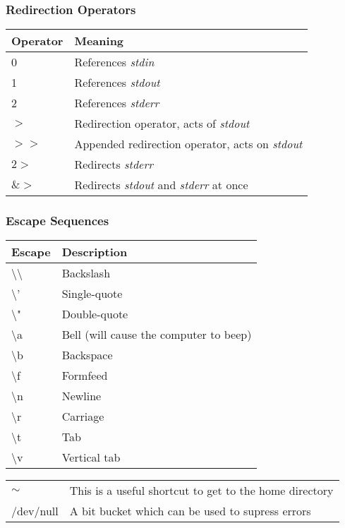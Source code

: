 \documentclass[12pt]{article}
\begin{document}
\vskip 0.15in
\subsubsection{Redirection Operators}%
\begin{tabular}{|l|l|}\hline
	Operator & Meaning\\ \hline
	0 & References \textit{stdin}\\
	1 & References \textit{stdout}\\
	2 & References \textit{stderr}\\
	$ > $ & Redirection operator, acts of \textit{stdout}\\
	$ >> $ & Appended redirection operator, acts on \textit{stdout}\\
	$2>$ & Redirects \textit{stderr}\\
	$\&>$ & Redirects \textit{stdout} and \textit{stderr} at once\\
	
	
	
	
	\hline

\end{tabular}

\vskip 0.15in
\subsubsection{Escape Sequences}
\begin{tabular}{|l|p{1.5in}|}
	\hline
	\textbf{Escape} & \textbf{Description}\\ \hline
	\textbackslash\textbackslash & Backslash\\
	\textbackslash ' & Single-quote\\
	\textbackslash " & Double-quote\\
	\textbackslash a & Bell (will cause the computer to beep)\\
	\textbackslash b & Backspace\\
	\textbackslash f & Formfeed\\
	\textbackslash n & Newline\\
	\textbackslash r & Carriage\\
	\textbackslash t & Tab\\
	\textbackslash v & Vertical tab\\
	
	\hline
\end{tabular}





\vskip 0.15in
\noindent\begin{tabular}{| l | l |}
	
	\hline
	$\mathtt{\sim}$ & This is a useful shortcut to get to the home directory\\
	/dev/null & A bit bucket which can be used to supress errors\\

	
	
	\hline

\end{tabular}
\end{document}

